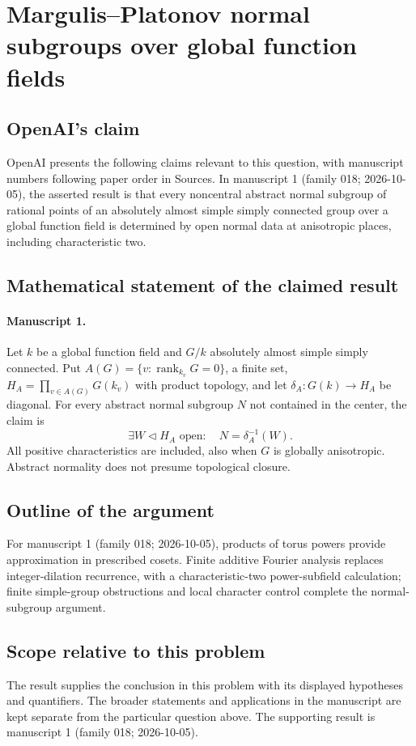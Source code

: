 \documentclass[11pt]{article}
\begin{document}
\section*{Margulis–Platonov normal subgroups over global function fields}

\subsection{OpenAI's claim}
OpenAI presents the following claims relevant to this question, with manuscript numbers following paper order in Sources. In manuscript 1 (family 018; 2026-10-05), the asserted result is that every noncentral abstract normal subgroup of rational points of an absolutely almost simple simply connected group over a global function field is determined by open normal data at anisotropic places, including characteristic two.

\subsection{Mathematical statement of the claimed result}
\paragraph{Manuscript 1.}
Let $k$ be a global function field and $G/k$ absolutely almost simple simply connected. Put $A(G)=\{v:\operatorname{rank}_{k_v}G=0\}$, a finite set, $H_A=\prod_{v\in A(G)}G(k_v)$ with product topology, and let $\delta_A:G(k)\to H_A$ be diagonal. For every abstract normal subgroup $N$ not contained in the center, the claim is
\[
 \exists W\triangleleft H_A\text{ open}:\quad N=\delta_A^{-1}(W).
\]
All positive characteristics are included, also when $G$ is globally anisotropic. Abstract normality does not presume topological closure.

\subsection{Outline of the argument}
For manuscript 1 (family 018; 2026-10-05), products of torus powers provide approximation in prescribed cosets. Finite additive Fourier analysis replaces integer-dilation recurrence, with a characteristic-two power-subfield calculation; finite simple-group obstructions and local character control complete the normal-subgroup argument.

\subsection{Scope relative to this problem}
The result supplies the conclusion in this problem with its displayed hypotheses and quantifiers. The broader statements and applications in the manuscript are kept separate from the particular question above. The supporting result is manuscript 1 (family 018; 2026-10-05).
\end{document}
